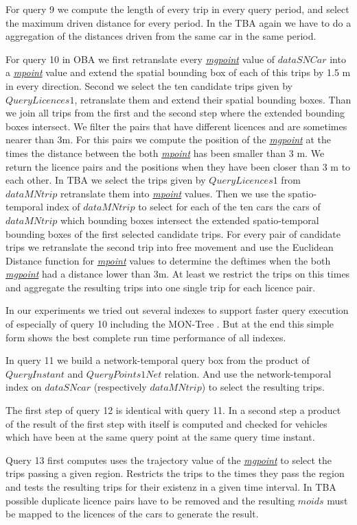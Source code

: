 \documentclass[a4paper]{article}
\newcommand{\dt}[1]{\textsl{\underline{#1}}}
\begin{document}
For query 9 we compute the length of every trip in every query period, and select the
maximum driven distance for every period. In the TBA again we have to do a
aggregation of the distances driven from the same car in the same period.

For query 10 in OBA we first retranslate every \dt{mgpoint} value of $dataSNCar$ into
a \dt{mpoint} value and extend the spatial bounding box of each of this
trips by 1.5 m in every direction. Second we select the ten candidate trips given by
$QueryLicences1$, retranslate them and extend their spatial bounding boxes. Than we
join all trips from the first and the second step where the
extended bounding boxes intersect. We filter the pairs that have different licences
and are sometimes nearer than 3m. For this pairs we compute the position of the
\dt{mgpoint} at the times the distance between the both \dt{mpoint} has been smaller
than 3 m. We return the licence pairs and the positions when they have been closer
than 3 m to each other. In TBA we select the trips given by $QueryLicences1$ from
$dataMNtrip$ retranslate them into \dt{mpoint} values. Then we use the
spatio-temporal index of $dataMNtrip$ to select for each of the ten cars the cars
of $dataMNtrip$ which bounding boxes intersect the extended spatio-temporal bounding
boxes of the first selected candidate trips. For every pair of candidate trips we
retranslate the second trip into free movement and use the Euclidean Distance
function for \dt{mpoint} values to determine the deftimes when the both \dt{mgpoint}
had a distance lower than 3m. At least we restrict the trips on this times and
aggregate the resulting trips into one single trip for each licence pair.

In our experiments we tried out several indexes to support faster query execution of
especially of query 10 including the MON-Tree \cite{MONTree}. But at the end this
simple form shows the best complete run time performance of all indexes.

In query 11 we build a network-temporal query box from the product of $QueryInstant$
and $QueryPoints1Net$ relation. And use the network-temporal index on $dataSNcar$
(respectively $dataMNtrip$) to select the resulting trips.

The first step of query 12 is identical with query 11. In a second step a product of
the result of the first step with itself is computed and checked for vehicles which
have been at the same query point at the same query time instant.

Query 13 first computes uses the trajectory value of the \dt{mgpoint} to select the
trips passing a given region. Restricts the trips to the times they pass the region
and tests the resulting trips for their existenz in a given time interval. In TBA
possible duplicate licence pairs have to be removed and the resulting $moids$ must
be mapped to the licences of the cars to generate the result.
\end{document}
